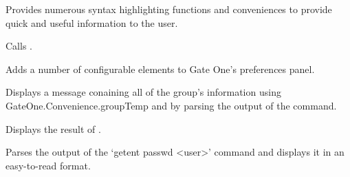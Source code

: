 \documentclass[letterpaper,10pt,openany]{sphinxmanual}
\begin{document}
\begin{fulllineitems}
\label{Applications/terminal/plugin_convenience:GateOne.Convenience}
Provides numerous syntax highlighting functions and conveniences to provide quick and useful information to the user.


\begin{fulllineitems}
\label{Applications/terminal/plugin_convenience:GateOne.Convenience.IPInfo}
Calls .

\end{fulllineitems}



\begin{fulllineitems}
\label{Applications/terminal/plugin_convenience:GateOne.Convenience.addPrefs}
Adds a number of configurable elements to Gate One's preferences panel.

\end{fulllineitems}



\begin{fulllineitems}
\label{Applications/terminal/plugin_convenience:GateOne.Convenience.displayGroupInfo}
Displays a message conaining all of the group's information using GateOne.Convenience.groupTemp and by parsing the output of the  command.

\end{fulllineitems}



\begin{fulllineitems}
\label{Applications/terminal/plugin_convenience:GateOne.Convenience.displayIPInfo}
Displays the result of .

\end{fulllineitems}



\begin{fulllineitems}
\label{Applications/terminal/plugin_convenience:GateOne.Convenience.displayUserInfo}
Parses the output of the `getent passwd \textless{}user\textgreater{}' command and displays it in an easy-to-read format.


\end{fulllineitems}
\end{fulllineitems}
\end{document}

